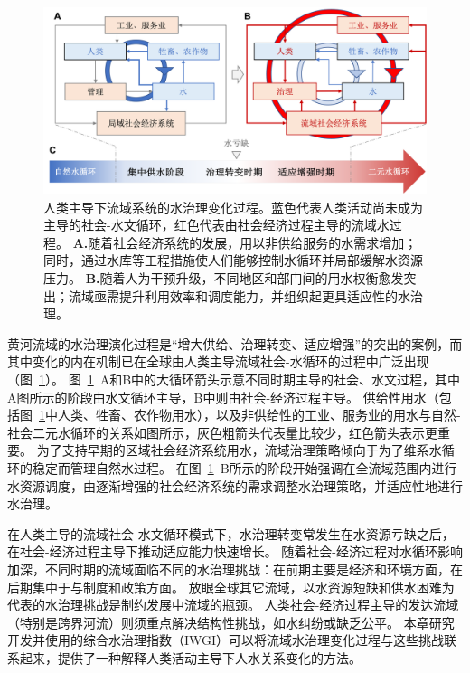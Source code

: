 \begin{figure}[!ht]
	\includegraphics[width=\textwidth]{img/ch4/ch4_transition.png}
	\caption[人类主导下流域系统的水治理阶段过渡]{
		人类主导下流域系统的水治理变化过程。蓝色代表人类活动尚未成为主导的社会-水文循环，红色代表由社会经济过程主导的流域水过程。
        \textbf{A.}随着社会经济系统的发展，用以非供给服务的水需求增加；同时，通过水库等工程措施使人们能够控制水循环并局部缓解水资源压力。
        \textbf{B.}随着人为干预升级，不同地区和部门间的用水权衡愈发突出；流域亟需提升利用效率和调度能力，并组织起更具适应性的水治理。
	}\label{fig:summary}
\end{figure}

黄河流域的水治理演化过程是“增大供给、治理转变、适应增强”的突出的案例，而其中变化的内在机制已在全球由人类主导流域社会-水循环的过程中广泛出现（图~\ref{fig:summary}）。
图~\ref{fig:summary}~A和B中的大循环箭头示意不同时期主导的社会、水文过程，其中A图所示的阶段由水文循环主导，B中则由社会-经济过程主导。
供给性用水（包括图~\ref{fig:summary}中人类、牲畜、农作物用水），以及非供给性的工业、服务业的用水与自然-社会二元水循环的关系如图所示，灰色粗箭头代表量比较少，红色箭头表示更重要。
为了支持早期的区域社会经济系统用水，流域治理策略倾向于为了维系水循环的稳定而管理自然水过程。
在图~\ref{fig:summary}~B所示的阶段开始强调在全流域范围内进行水资源调度，由逐渐增强的社会经济系统的需求调整水治理策略，并适应性地进行水治理。

在人类主导的流域社会-水文循环模式下，水治理转变常发生在水资源亏缺之后，在社会-经济过程主导下推动适应能力快速增长。
随着社会-经济过程对水循环影响加深，不同时期的流域面临不同的水治理挑战：在前期主要是经济和环境方面，在后期集中于与制度和政策方面。
放眼全球其它流域，以水资源短缺和供水困难为代表的水治理挑战是制约发展中流域的瓶颈\cite{allan2019,speed2013,liu2012}。
人类社会-经济过程主导的发达流域（特别是跨界河流）则须重点解决结构性挑战，如水纠纷或缺乏公平\cite{mirumachi2015}。
本章研究开发并使用的综合水治理指数（IWGI）可以将流域水治理变化过程与这些挑战联系起来，提供了一种解释人类活动主导下人\textendash{}水关系变化的方法。

